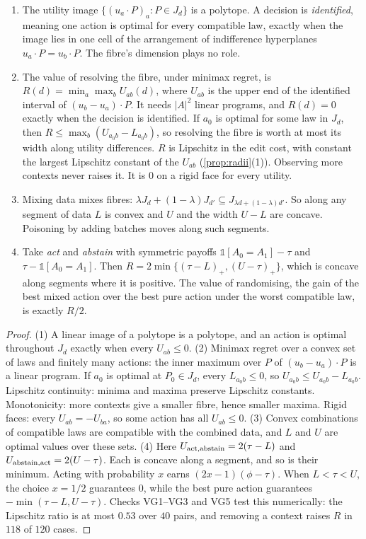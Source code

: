 \documentclass[11pt]{article}
\theoremstyle{definition}\newtheorem{definition}[theorem]{Definition}\newtheorem{remark}[theorem]{Remark}\newtheorem{example}[theorem]{Example}\newtheorem{problem}[theorem]{Open problem}\crefname{problem}{Problem}{Problems}
\begin{document}
\begin{proposition}\label{prop:decisions}
\begin{enumerate}
\item[(1)] The utility image $\{(u_a\cdot P)_a:P\in J_d\}$ is a polytope. A decision is \emph{identified}, meaning one action is optimal for every compatible law, exactly when the image lies in one cell of the arrangement of indifference hyperplanes $u_a\cdot P=u_b\cdot P$. The fibre's dimension plays no role.
\item[(2)] The value of resolving the fibre, under minimax regret, is $R(d)=\min_a\max_b U_{ab}(d)$, where $U_{ab}$ is the upper end of the identified interval of $(u_b-u_a)\cdot P$. It needs $|A|^2$ linear programs, and $R(d)=0$ exactly when the decision is identified. If $a_0$ is optimal for some law in $J_d$, then $R\le\max_b(U_{a_0b}-L_{a_0b})$, so resolving the fibre is worth at most its width along utility differences. $R$ is Lipschitz in the edit cost, with constant the largest Lipschitz constant of the $U_{ab}$ (\cref{prop:radii}(1)). Observing more contexts never raises it. It is $0$ on a rigid face for every utility.
\item[(3)] Mixing data mixes fibres: $\lambda J_d+(1-\lambda)J_{d'}\subseteq J_{\lambda d+(1-\lambda)d'}$. So along any segment of data $L$ is convex and $U$ and the width $U-L$ are concave. Poisoning by adding batches moves along such segments.
\item[(4)] Take \emph{act} and \emph{abstain} with symmetric payoffs $\mathbb 1[A_0=A_1]-\tau$ and $\tau-\mathbb 1[A_0=A_1]$. Then $R=2\min\{(\tau-L)_+,(U-\tau)_+\}$, which is concave along segments where it is positive. The value of randomising, the gain of the best mixed action over the best pure action under the worst compatible law, is exactly $R/2$.
\end{enumerate}
\end{proposition}

\begin{proof}
(1) A linear image of a polytope is a polytope, and an action is optimal throughout $J_d$ exactly when every $U_{ab}\le0$. (2) Minimax regret over a convex set of laws and finitely many actions: the inner maximum over $P$ of $(u_b-u_a)\cdot P$ is a linear program. If $a_0$ is optimal at $P_0\in J_d$, every $L_{a_0b}\le0$, so $U_{a_0b}\le U_{a_0b}-L_{a_0b}$. Lipschitz continuity: minima and maxima preserve Lipschitz constants. Monotonicity: more contexts give a smaller fibre, hence smaller maxima. Rigid faces: every $U_{ab}=-U_{ba}$, so some action has all $U_{ab}\le0$. (3) Convex combinations of compatible laws are compatible with the combined data, and $L$ and $U$ are optimal values over these sets. (4) Here $U_{\rm act,abstain}=2(\tau-L)$ and $U_{\rm abstain,act}=2(U-\tau)$. Each is concave along a segment, and so is their minimum. Acting with probability $x$ earns $(2x-1)(\phi-\tau)$. When $L<\tau<U$, the choice $x=1/2$ guarantees $0$, while the best pure action guarantees $-\min(\tau-L,U-\tau)$. Checks VG1--VG3 and VG5 test this numerically: the Lipschitz ratio is at most $0.53$ over $40$ pairs, and removing a context raises $R$ in $118$ of $120$ cases.
\end{proof}
\end{document}

